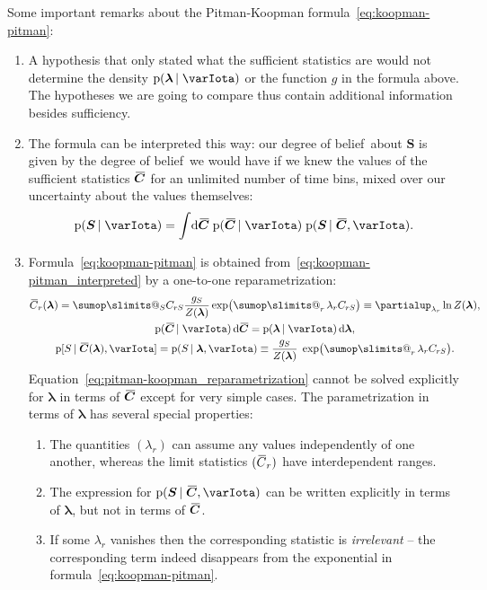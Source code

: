 \documentclass[\ifafour a4paper,12pt,\else a5paper,10pt,\fi%
onecolumn,oneside,article,%
british%
]{memoir}
\makeatletter
\theoremstyle{remark}
\theoremstyle{innote}
\def\sum{\DOTSI\sumop\slimits@}
\newcommand*{\de}{\partialup}%
\newcommand*{\di}{\mathrm{d}}%
\newcommand*{\pf}{\mathrm{p}}%
\renewcommand*{\|}{\nonscript\,\vert\nonscript\;\mathopen{}}
\newcommand*{\tsum}{\mathop{\textstyle\sum}\nolimits}
\newcommand*{\widebar}[1]{{\mkern1.5mu\skew{2}\overline{\mkern-1.5mu#1\mkern-1.5mu}\mkern 1.5mu}}
\newcommand*{\dob}{degree of belief}
\newcommand*{\yS}{S}
\newcommand*{\ySt}{\bm{\yS}}
\newcommand*{\yll}{\lambda}
\newcommand*{\yl}{\bm{\lambda}}
\newcommand*{\ycc}{\widebar{C}}
\newcommand*{\yc}{\widebar{\bm{C}}}
\newcommand*{\yg}{g}
\newcommand*{\yI}{\varIota}
\makeatother
\begin{document}
Some important remarks about the Pitman-Koopman
formula~\eqref{eq:koopman-pitman}:
\begin{enumerate}[label=\alph*.]
\item A hypothesis that only stated what the sufficient statistics are
  would not determine the density $\pf(\yl \| \yI)$ or the function $\yg$
  in the formula above. The hypotheses we are going to compare thus contain
  additional information besides sufficiency.
\item The formula can be interpreted this way: our \dob\ about $\ySt$ is
  given by the \dob\ we would have if we knew the values of the sufficient
  statistics $\yc$ for an unlimited number of time bins, mixed over our
  uncertainty about the values themselves:
  \begin{equation}
    \label{eq:koopman-pitman_interpreted}
        \pf( \ySt \| \yI) =
        \int\!\di\yc\; \pf(\yc \| \yI)\;
        \pf(\ySt \| \yc, \yI).
  \end{equation}
\item \label{item:reparametrization}Formula~\eqref{eq:koopman-pitman} is
  obtained from~\eqref{eq:koopman-pitman_interpreted} by a one-to-one
  reparametrization:
\begin{gather}
  \label{eq:pitman-koopman_reparametrization}
  \ycc_{r}(\yl) = \sum_{\yS} C_{r\yS} \frac{\yg_{\yS}}{Z(\yl)}
  \exp\bigl(\tsum_{r} \yll_{r} C_{r\yS}\bigr)
  \equiv \de_{\yll_{r}} \ln Z(\yl),
  \\
  \pf(\yc \| \yI)\,\di\yc = \pf(\yl \| \yI)\,\di\yl,
  \\
  \pf[\yS \| \yc(\yl), \yI] = \pf(\yS \| \yl, \yI) \equiv
  \frac{\yg_{\yS}}{Z(\yl)}\;\exp\bigl(\tsum_{r} \yll_r C_{r\yS}\bigr).
\end{gather}
Equation~\eqref{eq:pitman-koopman_reparametrization} cannot be solved
explicitly for $\yl$ in terms of $\yc$ except for very simple cases. The
parametrization in terms of $\yl$ has several special properties:
\begin{enumerate}[label=\alph{enumi}.\arabic*.]
\item The quantities $(\yll_{r})$ can assume any values independently of
  one another, whereas the limit statistics $(\ycc_r)$ have interdependent
  ranges.
\item The expression for $\pf(\ySt \| \yc, \yI)$ can be written explicitly
  in terms of $\yl$, but not in terms of $\yc$.
\item If some $\yll_{r}$ vanishes then the corresponding statistic is
  \emph{irrelevant} -- the corresponding term indeed disappears from the
  exponential in formula~\eqref{eq:koopman-pitman}.
\end{enumerate}
\end{enumerate}
\end{document}
